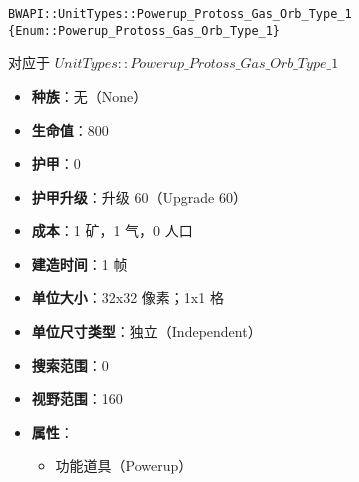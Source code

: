 \begin{tcolorbox}[colback=white, colframe=black!60!white, title=Powerup\_Protoss\_Gas\_Orb\_Type\_1(), arc=0mm]
    \begin{verbatim}
BWAPI::UnitTypes::Powerup_Protoss_Gas_Orb_Type_1 {Enum::Powerup_Protoss_Gas_Orb_Type_1}
    \end{verbatim}
    对应于  $UnitTypes::Powerup\_Protoss\_Gas\_Orb\_Type\_1$ 
    \begin{itemize}
        \item \textbf{种族}：无（None）
        \item \textbf{生命值}：800
        \item \textbf{护甲}：0
        \item \textbf{护甲升级}：升级 60（Upgrade 60）
        \item \textbf{成本}：1 矿，1 气，0 人口
        \item \textbf{建造时间}：1 帧
        \item \textbf{单位大小}：32x32 像素；1x1 格
        \item \textbf{单位尺寸类型}：独立（Independent）
        \item \textbf{搜索范围}：0
        \item \textbf{视野范围}：160
        \item \textbf{属性}：
            \begin{itemize}
                \item 功能道具（Powerup）
            \end{itemize}
    \end{itemize}
\end{tcolorbox}

